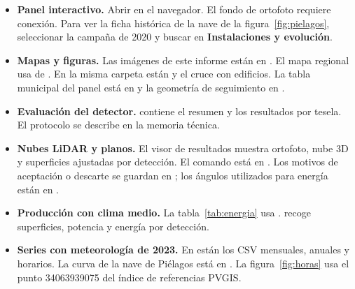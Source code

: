 \documentclass[11pt,a4paper]{article}
\begin{document}
{\small\raggedright
\begin{itemize}
\item \textbf{Panel interactivo.} Abrir  en el navegador. El fondo de ortofoto requiere conexión. Para ver la ficha histórica de la nave de la figura~\ref{fig:pielagos}, seleccionar la campaña de 2020 y buscar  en \textbf{Instalaciones y evolución}.
\item \textbf{Mapas y figuras.} Las imágenes de este informe están en . El mapa regional usa  de . En la misma carpeta están  y el cruce con edificios. La tabla municipal del panel está en  y la geometría de seguimiento en .
\item \textbf{Evaluación del detector.}  contiene el resumen y los resultados por tesela. El protocolo se describe en la memoria técnica.
\item \textbf{Nubes LiDAR y planos.} El visor de resultados muestra ortofoto, nube 3D y superficies ajustadas por detección. El comando está en . Los motivos de aceptación o descarte se guardan en ; los ángulos utilizados para energía están en .
\item \textbf{Producción con clima medio.} La tabla~\ref{tab:energia} usa .  recoge superficies, potencia y energía por detección.
\item \textbf{Series con meteorología de 2023.} En  están los CSV mensuales, anuales y horarios. La curva de la nave de Piélagos está en . La figura~\ref{fig:horas} usa el punto 34063939075 del índice de referencias PVGIS.
\end{itemize}
}
\end{document}
